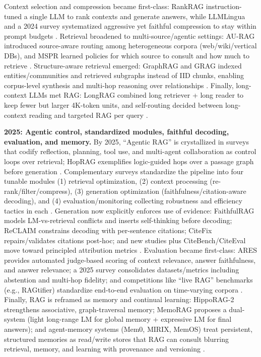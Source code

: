 Context selection and compression became first-class: RankRAG instruction-tuned a single LLM to rank contexts and generate answers, while LLMLingua and a 2024 survey systematized aggressive yet faithful compression to stay within prompt budgets \cite{rankrag2024, llmlingua2023, compression2024}. Retrieval broadened to multi-source/agentic settings: AU-RAG introduced source-aware routing among heterogeneous corpora (web/wiki/vertical DBs), and MSPR learned policies for which source to consult and how much to retrieve \cite{au_rag2024, mspr2024}. Structure-aware retrieval emerged: GraphRAG and GRAG indexed entities/communities and retrieved subgraphs instead of IID chunks, enabling corpus-level synthesis and multi-hop reasoning over relationships \cite{graphrag2024, grag2024}. Finally, long-context LLMs met RAG: LongRAG combined long retriever + long reader to keep fewer but larger 4K-token units, and self-routing decided between long-context reading and targeted RAG per query \cite{longrag2024, selfroute2024}.

\textbf{2025: Agentic control, standardized modules, faithful decoding, evaluation, and memory.}
By 2025, “Agentic RAG” is crystallized in surveys that codify reflection, planning, tool use, and multi-agent collaboration as control loops over retrieval; HopRAG exemplifies logic-guided hops over a passage graph before generation \cite{survey_agentic2025, survey_reasoning_agentic2025, hoprag2025}. Complementary surveys standardize the pipeline into four tunable modules (1) retrieval optimization, (2) context processing (re-rank/filter/compress), (3) generation optimization (faithfulness/citation-aware decoding), and (4) evaluation/monitoring collecting robustness and efficiency tactics in each \cite{knowledge_oriented_survey2025, architectures_survey2025}. Generation now explicitly enforces use of evidence: FaithfulRAG models LM-vs-retrieval conflicts and inserts self-thinking before decoding; ReCLAIM constrains decoding with per-sentence citations; CiteFix repairs/validates citations post-hoc; and new studies plus CiteBench/CiteEval move toward principled attribution metrics \cite{faithfulrag2025, reclaim2024, citefix2025, source_attribution2025, citeeval2025}. Evaluation became first-class: ARES provides automated judge-based scoring of context relevance, answer faithfulness, and answer relevance; a 2025 survey consolidates datasets/metrics including abstention and multi-hop fidelity; and competitions like “live RAG” benchmarks (e.g., RAGtifier) standardize end-to-end evaluation on time-varying corpora \cite{ares2024, survey_eval2025, ragtifier2025}. Finally, RAG is reframed as memory and continual learning: HippoRAG-2 strengthens associative, graph-traversal memory; MemoRAG proposes a dual-system (light long-range LM for global memory + expressive LM for final answers); and agent-memory systems (Mem0, MIRIX, MemOS) treat persistent, structured memories as read/write stores that RAG can consult blurring retrieval, memory, and learning with provenance and versioning \cite{hipporag2_2025, memorag2024, mem0_2025, mirix2025, memos2025}.

